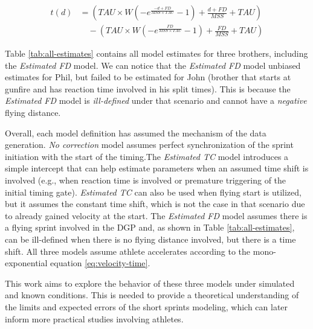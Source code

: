 \documentclass[fleqn,10pt]{wlpeerj} %
\begin{document}
\begin{equation}
  \begin{split}
   t(d) &= (TAU \times W(-e^{\frac{-d + FD}{MSS \times TAU}} - 1) + \frac{d + FD}{MSS} + TAU) \\ 
   &\quad-(TAU \times W(-e^{\frac{FD}{MSS \times TAU}} - 1) + \frac{FD}{MSS} + TAU) 
   \end{split}
   \label{eq:distance-correction}
\end{equation}

Table \ref{tab:all-estimates} contains all model estimates for three brothers, including the \emph{Estimated FD} model. We can notice that the \emph{Estimated FD} model unbiased estimates for Phil, but failed to be estimated for John (brother that starts at gunfire and has reaction time involved in his split times). This is because the \emph{Estimated FD} model is \emph{ill-defined} under that scenario and cannot have a \emph{negative} flying distance.

Overall, each model definition has assumed the mechanism of the data generation. \emph{No correction} model assumes perfect synchronization of the sprint initiation with the start of the timing.The \emph{Estimated TC} model introduces a simple intercept that can help estimate parameters when an assumed time shift is involved (e.g., when reaction time is involved or premature triggering of the initial timing gate). \emph{Estimated TC} can also be used when flying start is utilized, but it assumes the constant time shift, which is not the case in that scenario due to already gained velocity at the start. The \emph{Estimated FD} model assumes there is a flying sprint involved in the DGP and, as shown in Table \ref{tab:all-estimates}, can be ill-defined when there is no flying distance involved, but there is a time shift. All three models assume athlete accelerates according to the mono-exponential equation \eqref{eq:velocity-time}.

This work aims to explore the behavior of these three models under simulated and known conditions. This is needed to provide a theoretical understanding of the limits and expected errors of the short sprints modeling, which can later inform more practical studies involving athletes.
\end{document}
